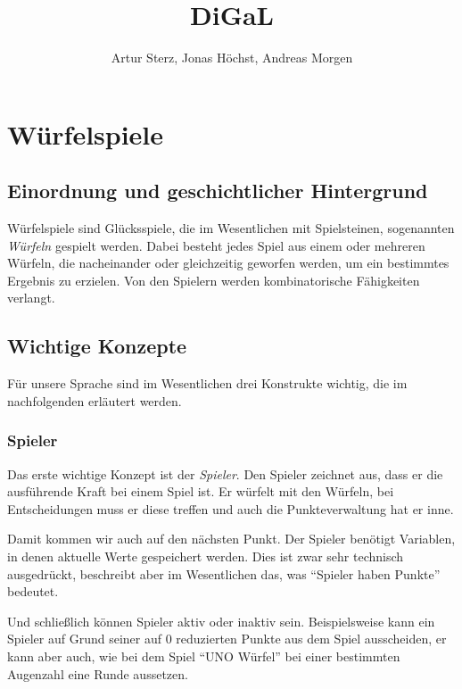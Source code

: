 \documentclass[a4paper, oneside]{book}
\begin{document}
	\begin{titlepage}
		\title{DiGaL}
		\author{Artur Sterz, Jonas Höchst, Andreas Morgen}
		\maketitle
	\end{titlepage}
	\tableofcontents
	\newpage

\chapter{Würfelspiele}
\label{cha:wurfelspiele}
	\section{Einordnung und geschichtlicher Hintergrund}
	\label{sec:einordnung_und_geschichtlicher_hintergrund}
        Würfelspiele sind Glücksspiele, die im Wesentlichen mit Spielsteinen, sogenannten \emph{Würfeln} gespielt werden. Dabei besteht jedes Spiel aus einem oder mehreren Würfeln, die nacheinander oder gleichzeitig geworfen werden, um ein bestimmtes Ergebnis zu erzielen. Von den Spielern werden kombinatorische Fähigkeiten verlangt.

        \section{Wichtige Konzepte}
        \label{sec:wichtige_konzepte}
        	Für unsere Sprache sind im Wesentlichen drei Konstrukte wichtig, die im nachfolgenden erläutert werden.
            \subsection{Spieler}
            \label{sub:spieler}
                Das erste wichtige Konzept ist der \emph{Spieler}. Den Spieler zeichnet aus, dass er die ausführende Kraft bei einem Spiel ist. Er würfelt mit den Würfeln, bei Entscheidungen muss er diese treffen und auch die Punkteverwaltung hat er inne.

                Damit kommen wir auch auf den nächsten Punkt. Der Spieler benötigt Variablen, in denen aktuelle Werte gespeichert werden. Dies ist zwar sehr technisch ausgedrückt, beschreibt aber im Wesentlichen das, was ``Spieler haben Punkte'' bedeutet.

                Und schließlich können Spieler aktiv oder inaktiv sein. Beispielsweise kann ein Spieler auf Grund seiner auf 0 reduzierten Punkte aus dem Spiel ausscheiden, er kann aber auch, wie bei dem Spiel ``UNO Würfel'' bei einer bestimmten Augenzahl eine Runde aussetzen.
\end{document}
